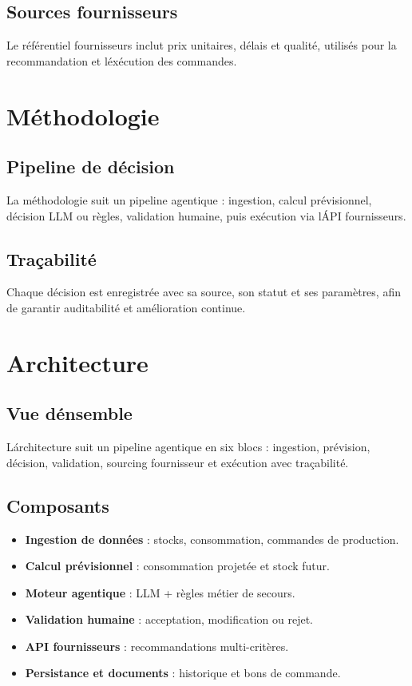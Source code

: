 \documentclass[12pt,a4paper]{report}
\begin{document}
\section{Sources fournisseurs}
Le r\'ef\'erentiel fournisseurs inclut prix unitaires, d\'elais et qualit\'e, utilis\'es pour la recommandation et l\'ex\'ecution des commandes.

\cleardoublepage

\chapter{M\'ethodologie}
\section{Pipeline de d\'ecision}
La m\'ethodologie suit un pipeline agentique : ingestion, calcul pr\'evisionnel, d\'ecision LLM ou r\`egles, validation humaine, puis ex\'ecution via l\'API fournisseurs.

\section{Tra\c{c}abilit\'e}
Chaque d\'ecision est enregistr\'ee avec sa source, son statut et ses param\`etres, afin de garantir auditabilit\'e et am\'elioration continue.

\cleardoublepage

\chapter{Architecture}
\section{Vue d\'ensemble}
L\'architecture suit un pipeline agentique en six blocs : ingestion, pr\'evision, d\'ecision, validation, sourcing fournisseur et ex\'ecution avec tra\c{c}abilit\'e.

\section{Composants}
\begin{itemize}
  \item \textbf{Ingestion de donn\'ees} : stocks, consommation, commandes de production.
  \item \textbf{Calcul pr\'evisionnel} : consommation projet\'ee et stock futur.
  \item \textbf{Moteur agentique} : LLM + r\`egles m\'etier de secours.
  \item \textbf{Validation humaine} : acceptation, modification ou rejet.
  \item \textbf{API fournisseurs} : recommandations multi-crit\`eres.
  \item \textbf{Persistance et documents} : historique et bons de commande.
\end{itemize}
\end{document}
